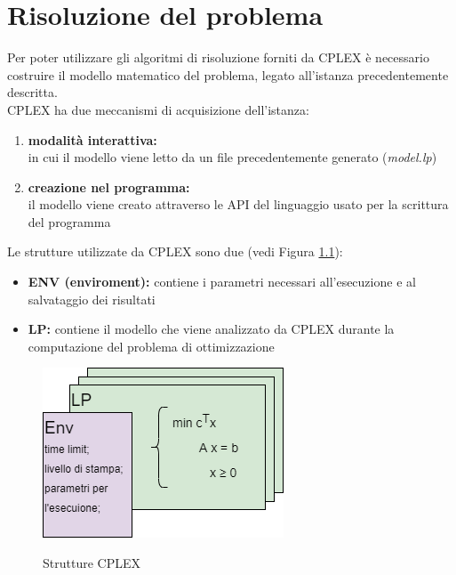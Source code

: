 \chapter{Risoluzione del problema}
Per poter utilizzare gli algoritmi di risoluzione forniti da CPLEX è necessario costruire il modello matematico del problema, legato all'istanza precedentemente descritta.\\
CPLEX ha due meccanismi di acquisizione dell'istanza:
\begin{enumerate}
\item{\textbf{modalità interattiva:}\\
in cui il modello viene letto da un file precedentemente generato (\textit{model.lp})}
\item{\textbf{creazione nel programma:}\\
il modello viene creato attraverso le API del linguaggio usato per la scrittura del programma}
\end{enumerate}

Le strutture utilizzate da CPLEX sono due (vedi Figura \ref{strutture_cplex}):
\begin{itemize}
\item{\textbf{ENV (enviroment):} contiene i parametri necessari all'esecuzione e al salvataggio dei risultati}
\item{\textbf{LP:} contiene il modello che viene analizzato da CPLEX durante la computazione del problema di ottimizzazione}
\end{itemize}

\begin{figure}[h] 
\begin{center} 
  \includegraphics[scale=0.5]{Images/cplex_structs}\\ 
  \caption{\footnotesize{Strutture CPLEX}}
  \label{strutture_cplex} 
\end{center} 
\end{figure}

